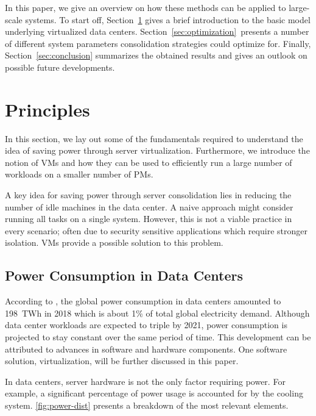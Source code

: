 \documentclass[12pt, a4paper]{scrartcl}
\begin{document}
In this paper, we give an overview on how these methods can be applied to large-scale systems.
To start off, Section~\ref{sec:principles} gives a brief introduction to the basic model underlying virtualized data centers.
Section~\ref{sec:optimization} presents a number of different system parameters consolidation strategies could optimize for.
Finally, Section~\ref{sec:conclusion} summarizes the obtained results and gives an outlook on possible future developments.

\section{Principles}\label{sec:principles}
In this section, we lay out some of the fundamentals required to understand the idea of saving power through server virtualization.
Furthermore, we introduce the notion of \acp{VM} and how they can be used to efficiently run a large number of workloads on a smaller number of \acp{PM}.

A key idea for saving power through server consolidation lies in reducing the number of idle machines in the data center.
A naive approach might consider running all tasks on a single system.
However, this is not a viable practice in every scenario; often due to security sensitive applications which require stronger isolation.
\acp{VM} provide a possible solution to this problem.

\subsection{Power Consumption in Data Centers}\label{sec:power-con}
According to \cite{iea_analysis_2019}, the global power consumption in data centers amounted to 198~TWh in 2018 which is about 1\% of total global electricity demand.
Although data center workloads are expected to triple by 2021, power consumption is projected to stay constant over the same period of time.
This development can be attributed to advances in software and hardware components.
One software solution, virtualization, will be further discussed in this paper.

In data centers, server hardware is not the only factor requiring power.
For example, a significant percentage of power usage is accounted for by the cooling system.
\autoref{fig:power-dist} presents a breakdown of the most relevant elements.
\end{document}
